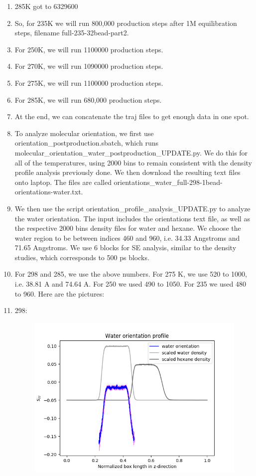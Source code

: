 \documentclass[12pt,reqno]{amsart}
\numberwithin{equation}{section}
\begin{document}
\begin{enumerate}
\item 285K got to 6329600
\item So, for 235K we will run 800,000 production steps after 1M equilibration steps, filename full-235-32bead-part2.  
\item For 250K, we will run 1100000 production steps.
\item For 270K, we will run 1090000 production steps.  
\item For 275K, we will run 1100000 production steps.  
\item For 285K, we will run 680,000 production steps.  
\item At the end, we can concatenate the traj files to get enough data in one spot.  
\item To analyze molecular orientation, we first use orientation\_postproduction.sbatch, which runs molecular\_orientation\_water\_postproduction\_UPDATE.py.  We do this for all of the temperatures, using 2000 bins to remain consistent with the density profile analysis previously done.  We then download the resulting text files onto laptop.  The files are called orientations\_water\_full-298-1bead-orientations-water.txt.  
\item We then use the script orientation\_profile\_analysis\_UPDATE.py to analyze the water orientation.  The input includes the orientations text file, as well as the respective 2000 bins density files for water and hexane.  We choose the water region to be between indices 460 and 960, i.e. 34.33 Angstroms and 71.65 Angstroms.  We use 6 blocks for SE analysis, similar to the density studies, which corresponds to 500 ps blocks.  
\item For 298 and 285, we use the above numbers.  For 275 K, we use 520 to 1000, i.e. 38.81 A and 74.64 A.  For 250 we used 490 to 1050.  For 235 we used 480 to 960.  Here are the pictures:

\item 298:

\begin{figure}[H]
\centering
\includegraphics[scale=0.6]{full-298-1bead-water-orientation}
\end{figure}


\end{enumerate}
\end{document}
